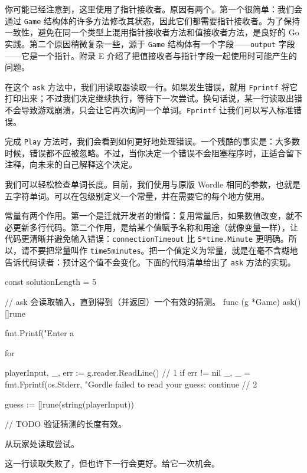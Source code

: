 你可能已经注意到，这里使用了指针接收者。原因有两个。第一个很简单：我们会通过 \texttt{Game} 结构体的许多方法修改其状态，因此它们都需要指针接收者。为了保持一致性，避免在同一个类型上混用指针接收者方法和值接收者方法，是良好的 Go 实践。第二个原因稍微复杂一些，源于 \texttt{Game} 结构体有一个字段——\texttt{output} 字段——它是一个指针。附录 E 介绍了把值接收者与指针字段一起使用时可能产生的问题。

在这个 \texttt{ask} 方法中，我们用读取器读取一行。如果发生错误，就用 \texttt{Fprintf} 将它打印出来；不过我们决定继续执行，等待下一次尝试。换句话说，某一行读取出错不会导致游戏崩溃，只会让它再次询问一个单词。\texttt{Fprintf} 让我们可以写入标准错误。

完成 \texttt{Play} 方法时，我们会看到如何更好地处理错误。一个残酷的事实是：大多数时候，错误都不应被忽略。不过，当你决定一个错误不会阻塞程序时，正适合留下注释，向未来的自己解释这个决定。

我们可以轻松检查单词长度。目前，我们使用与原版 Wordle 相同的参数，也就是五字符单词。可以在包级别定义一个常量，并在需要它的每个地方使用。

常量有两个作用。第一个是迁就开发者的懒惰：复用常量后，如果数值改变，就不必更新多行代码。第二个作用，是给某个值赋予名称和用途（就像变量一样），让代码更清晰并避免输入错误：\texttt{connectionTimeout} 比
\texttt{5*time.Minute} 更明确。所以，请不要把常量叫作 \texttt{time5minutes}。把一个值定义为常量，就是在毫不含糊地告诉代码读者：预计这个值不会变化。下面的代码清单给出了 \texttt{ask} 方法的实现。

\begin{gocode}[title={代码清单 5.9 \texttt{game.go}：使用读取器的 \texttt{ask} 方法}]
const solutionLength = 5

// ask 会读取输入，直到得到（并返回）一个有效的猜测。
func (g *Game) ask() []rune {
    fmt.Printf("Enter a %

    for {
        playerInput, _, err := g.reader.ReadLine() // 1
        if err != nil {
            _, _ = fmt.Fprintf(os.Stderr,
                "Gordle failed to read your guess: %
            continue // 2
        }

        guess := []rune(string(playerInput))

        // TODO 验证猜测的长度有效。
    }
}
\end{gocode}

\begin{codeannotations}
  \item 从玩家处读取尝试。
  \item 这一行读取失败了，但也许下一行会更好。给它一次机会。
\end{codeannotations}

